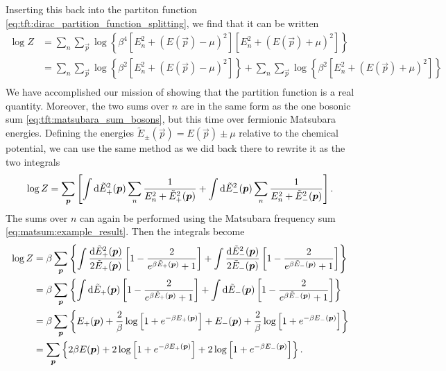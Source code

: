 Inserting this back into the partiton function \eqref{eq:tft:dirac_partition_function_splitting}, we find that it can be written
\begin{equation}
\begin{split}
	\log Z & = \sum_n \sum_\vec{p} \log \left\{ \beta^4 \left[ E_n^2 + (E(\vec{p}) - \mu)^2 \right] \left[ E_n^2 + (E(\vec{p}) + \mu)^2 \right] \right\} \\
	       & = \sum_n \sum_\vec{p} \log \left\{ \beta^2 \left[ E_n^2 + (E(\vec{p}) - \mu)^2 \right] \right\} + \sum_n \sum_\vec{p} \log \left\{ \beta^2 \left[ E_n^2 + (E(\vec{p}) + \mu)^2 \right] \right\} \\
\end{split}
\label{eq:tft:fermion_log_sum}
\end{equation}
We have accomplished our mission of showing that the partition function is a real quantity.
Moreover, the two sums over $n$ are in the same form as the one bosonic sum \eqref{eq:tft:matsubara_sum_bosons}, but this time over fermionic Matsubara energies.
Defining the energies $\tilde E_\pm(\vec{p}) = E(\vec{p}) \pm \mu$ relative to the chemical potential, we can use the same method as we did back there to rewrite it as the two integrals
\begin{equation}
	\log Z = \sum_{\bm{p}} \left[ \int \mathop{}\!\mathrm{d} \tilde E_+^2({\bm{p}}) \sum_n \frac{1}{E_n^2 + \tilde E_+^2({\bm{p}})} +
	                             \int \mathop{}\!\mathrm{d} \tilde E_-^2({\bm{p}}) \sum_n \frac{1}{E_n^2 + \tilde E_-^2({\bm{p}})} \right] .
\label{eq:tft:matsubara_sum_fermions}
\end{equation}
The sums over $n$ can again be performed using the Matsubara frequency sum \eqref{eq:matsum:example_result}.
Then the integrals become
\begin{equation}
\begin{split}
	\log Z &= \beta \sum_{\bm{p}} \left\{ \int \frac{\mathop{}\!\mathrm{d} \tilde E_+^2({\bm{p}})}{2 \tilde E_+({\bm{p}})} \left[ 1 - \frac{2}{e^{\beta \tilde E_+({\bm{p}})} + 1} \right] +
	                                     \int \frac{\mathop{}\!\mathrm{d} \tilde E_-^2({\bm{p}})}{2 \tilde E_-({\bm{p}})} \left[ 1 - \frac{2}{e^{\beta \tilde E_-({\bm{p}})} + 1} \right] \right\} \\
	       &= \beta \sum_{\bm{p}} \left\{ \int \mathop{}\!\mathrm{d} \tilde E_+({\bm{p}}) \left[ 1 - \frac{2}{e^{\beta \tilde E_+({\bm{p}})} + 1} \right] +
	                                     \int \mathop{}\!\mathrm{d} \tilde E_-({\bm{p}}) \left[ 1 - \frac{2}{e^{\beta \tilde E_-({\bm{p}})} + 1} \right] \right\} \\
	       &= \beta \sum_{\bm{p}} \left\{ E_+({\bm{p}}) + \frac{2}{\beta} \log \left[ 1 + e^{-\beta E_+({\bm{p}})} \right] +
	                                     E_-({\bm{p}}) + \frac{2}{\beta} \log \left[ 1 + e^{-\beta E_-({\bm{p}})} \right] \right\} \\
	       &=       \sum_{\bm{p}} \left\{ 2 \beta E({\bm{p}}) + 2 \log \left[ 1 + e^{-\beta E_+({\bm{p}})} \right] + 2 \log \left[ 1 + e^{-\beta E_-({\bm{p}})} \right] \right\} . \\
\end{split}
\end{equation}
